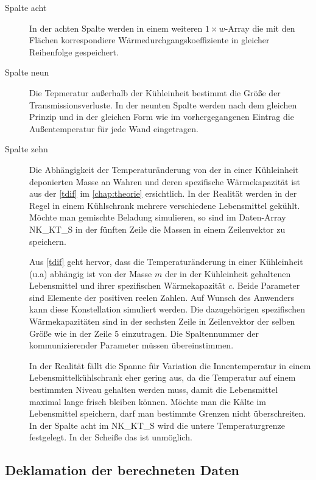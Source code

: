 \begin{description}
	\item [{Spalte acht}] In der achten Spalte werden in einem weiteren $1\times w$-Array die mit den Flächen
	korrespondiere Wärmedurchgangskoeffiziente in gleicher Reihenfolge gespeichert.

	\item [{Spalte neun}] Die Tepmeratur außerhalb der Kühleinheit bestimmt die Größe der
	Transmissionsverluste. In der neunten Spalte werden nach dem gleichen Prinzip und in der gleichen Form wie im
	vorhergegangenen Eintrag die Außentemperatur für jede Wand eingetragen.

	\item [{Spalte zehn}] Die Abhängigkeit der Temperaturänderung von der in einer Kühleinheit deponierten Masse an Wahren
	und deren spezifische Wärmekapazität ist aus der \cref{tdif} im \cref{chap:theorie} ersichtlich. In der Realität
	werden in der Regel in einem Kühlschrank mehrere verschiedene Lebensmittel gekühlt. Möchte man gemischte Beladung
	simulieren, so sind im Daten-Array NK\_KT\_S in der fünften Zeile die Massen in einem Zeilenvektor zu speichern.

	Aus \cref{tdif} geht hervor, dass die Temperaturänderung in einer Kühleinheit (u.a) abhängig
	ist von der Masse $m$ der in der Kühleinheit gehaltenen Lebensmittel und ihrer spezifischen Wärmekapazität $c$. Beide
	Parameter sind Elemente der positiven reelen Zahlen.    Auf Wunsch des Anwenders kann diese Konstellation simuliert werden.
	 Die dazugehörigen spezifischen Wärmekapazitäten sind in der sechsten Zeile in Zeilenvektor
	der selben Größe wie in der Zeile 5 einzutragen. Die Spaltennummer der kommunizierender
	Parameter müssen übereinstimmen.

In der Realität fällt die Spanne für Variation die Innentemperatur in einem Lebensmittelkühlschrank eher gering aus, da die
Temperatur auf einem bestimmten Niveau gehalten werden muss, damit die Lebensmittel maximal lange frisch bleiben können.
Möchte man die Kälte im Lebensmittel speichern, darf man bestimmte Grenzen nicht überschreiten. In der Spalte acht im
NK\_KT\_S wird die untere Temperaturgrenze festgelegt. In der Scheiße das ist unmöglich.

\end{description}
\subsection{Deklamation der berechneten Daten}

